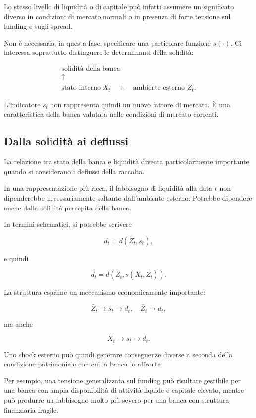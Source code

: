 Lo stesso livello di liquidit\`a o di capitale pu\`o infatti assumere un
significato diverso in condizioni di mercato normali o in presenza di forte
tensione sul funding e sugli spread.

Non \`e necessario, in questa fase, specificare una particolare funzione
$s(\cdot)$. Ci interessa soprattutto distinguere le determinanti della
solidit\`a:

\[
\boxed{
\begin{array}{c}
\text{solidit\`a della banca}\\[3pt]
\uparrow\\[3pt]
\text{stato interno }X_t
\quad+\quad
\text{ambiente esterno }\bar Z_t.
\end{array}
}
\]

L'indicatore $s_t$ non rappresenta quindi un nuovo fattore di mercato. \`E
una caratteristica della banca valutata nelle condizioni di mercato
correnti.

\subsection{Dalla solidit\`a ai deflussi}

La relazione tra stato della banca e liquidit\`a diventa particolarmente
importante quando si considerano i deflussi della raccolta.

In una rappresentazione pi\`u ricca, il fabbisogno di liquidit\`a alla data
$t$ non dipenderebbe necessariamente soltanto dall'ambiente esterno.
Potrebbe dipendere anche dalla solidit\`a percepita della banca.

In termini schematici, si potrebbe scrivere

\[
d_t
=
d(\bar Z_t,s_t),
\]

\noindent e quindi

\[
d_t
=
d\left(
\bar Z_t,
s(X_t,\bar Z_t)
\right).
\]

La struttura esprime un meccanismo economicamente importante:

\[
\bar Z_t
\longrightarrow
s_t
\longrightarrow
d_t,
\quad \bar Z_t
\longrightarrow
d_t,
\]

\noindent ma anche

\[
X_t
\longrightarrow
s_t
\longrightarrow
d_t.
\]

Uno shock esterno pu\`o quindi generare conseguenze diverse a seconda della
condizione patrimoniale con cui la banca lo affronta.

Per esempio, una tensione generalizzata sul funding pu\`o risultare
gestibile per una banca con ampia disponibilit\`a di attivit\`a liquide e
capitale elevato, mentre pu\`o produrre un fabbisogno molto pi\`u severo per
una banca con struttura finanziaria fragile.


